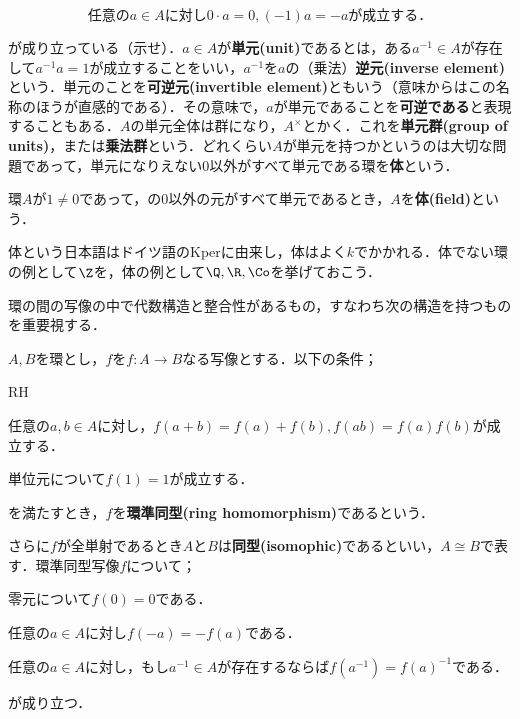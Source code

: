\[\text{任意の} a\in A\text{に対し} 0\cdot a=0, (-1)a=-a\text{が成立する．}\]

が成り立っている（示せ）．$a\in A$が\textbf{単元(unit)}であるとは，ある$a^{-1}\in A$が存在して$a^{-1}a=1$が成立することをいい，$a^{-1}$を$a$の（乗法）\textbf{逆元(inverse element)}という．単元のことを\textbf{可逆元(invertible element)}ともいう（意味からはこの名称のほうが直感的である）．その意味で，$a$が単元であることを\textbf{可逆である}と表現することもある．$A$の単元全体は群になり，$A^\times$とかく．これを\textbf{単元群(group of units)}，または\textbf{乗法群}という．どれくらい$A$が単元を持つかというのは大切な問題であって，単元になりえない$0$以外がすべて単元である環を\textbf{体}という．

\begin{defi}[体]
	環$A$が$1\neq 0$であって，の0以外の元がすべて単元であるとき，$A$を\textbf{体(field)}という．
\end{defi}

体という日本語はドイツ語のKperに由来し，体はよく$k$でかかれる．体でない環の例として$\Z$を，体の例として$\Q, \R, \Co$を挙げておこう．

環の間の写像の中で代数構造と整合性があるもの，すなわち次の構造を持つものを重要視する．

\begin{defi}[環準同型]
	$A,B$を環とし，$f$を$f:A\to B$なる写像とする．以下の条件；
	\begin{defiterm}{RH}
		\item 任意の$a,b\in A$に対し，$f(a+b)=f(a)+f(b), f(ab)=f(a)f(b)$が成立する．
		\item 単位元について$f(1)=1$が成立する．
	\end{defiterm}
	
	を満たすとき，$f$を\textbf{環準同型(ring homomorphism)}であるという．
\end{defi}

さらに$f$が全単射であるとき$A$と$B$は\textbf{同型(isomophic)}であるといい，$A\cong B$で表す．環準同型写像$f$について；

\begin{sakura}
	\item 零元について$f(0)=0$である．
	\item 任意の$a\in A$に対し$f(-a)=-f(a)$である．
	\item 任意の$a\in A$に対し，もし$a^{-1}\in A$が存在するならば$f(a^{-1})=f(a)^{-1}$である．
\end{sakura}
が成り立つ．

